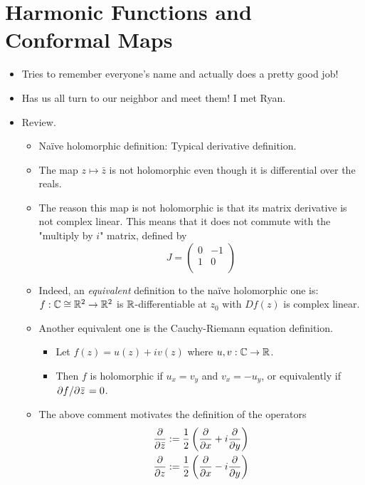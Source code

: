 \documentclass[../notes.tex]{subfiles}
\begin{document}
\section{Harmonic Functions and Conformal Maps}
\begin{itemize}
    \item {}Tries to remember everyone's name and actually does a pretty good job!
    \item Has us all turn to our neighbor and meet them! I met Ryan.
    \item Review.
    \begin{itemize}
        \item Na\"{i}ve holomorphic definition: Typical derivative definition.
        \item The map $z\mapsto\bar{z}$ is not holomorphic even though it is differential over the reals.
        \item The reason this map is not holomorphic is that its matrix derivative is not complex linear. This means that it does not commute with the "multiply by $i$" matrix, defined by
        \begin{equation*}
            J =
            \begin{pmatrix}
                0 & -1\\
                1 & 0\\
            \end{pmatrix}
        \end{equation*}
        \item Indeed, an \emph{equivalent} definition to the na\"{i}ve holomorphic one is: $f:\mathbb{C}\cong\mathbb{R}^2\to\mathbb{R}^2$ is $\mathbb{R}$-differentiable at $z_0$ with $Df(z)$ is complex linear.
        \item Another equivalent one is the Cauchy-Riemann equation definition.
        \begin{itemize}
            \item Let $f(z)=u(z)+iv(z)$ where $u,v:\mathbb{C}\to\mathbb{R}$.
            \item Then $f$ is holomorphic if $u_x=v_y$ and $v_x=-u_y$, or equivalently if $\pdv*{f}{\bar{z}}=0$.
        \end{itemize}
        \item The above comment motivates the definition of the operators
        \begin{align*}
            \pdv{\bar{z}} &:= \frac{1}{2}\left( \pdv{x}+i\pdv{y} \right)\\
            \pdv{z} &:= \frac{1}{2}\left( \pdv{x}-i\pdv{y} \right)

\end{align*}
\end{itemize}
\end{itemize}
\end{document}
